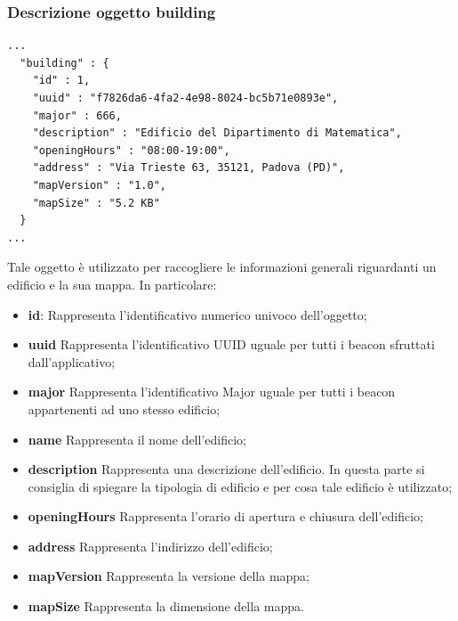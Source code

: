 \documentclass[../ManualeSviluppatore.tex]{subfiles}
\begin{document}
	\subsubsection{Descrizione oggetto building}
		\begin{lstlisting}
...
  "building" : {
    "id" : 1,
    "uuid" : "f7826da6-4fa2-4e98-8024-bc5b71e0893e",
    "major" : 666,
    "description" : "Edificio del Dipartimento di Matematica",
    "openingHours" : "08:00-19:00",
    "address" : "Via Trieste 63, 35121, Padova (PD)",
    "mapVersion" : "1.0",
    "mapSize" : "5.2 KB"
  }
...
		\end{lstlisting}
		Tale oggetto è utilizzato per raccogliere le informazioni generali riguardanti un edificio e la sua mappa. In particolare:
		\begin{itemize}
			\item \textbf{id}: Rappresenta l'identificativo numerico univoco dell'oggetto;
			\item \textbf{uuid} Rappresenta l'identificativo UUID uguale per tutti i \gls{beacon} sfruttati dall'applicativo;
			\item \textbf{major} Rappresenta l'identificativo Major uguale per tutti i \gls{beacon} appartenenti ad uno stesso edificio;
			\item \textbf{name} Rappresenta il nome dell'edificio;
			\item \textbf{description} Rappresenta una descrizione dell'edificio. In questa parte si consiglia di spiegare la tipologia di edificio e per cosa tale edificio è utilizzato;
			\item \textbf{openingHours} Rappresenta l'orario di apertura e chiusura dell'edificio;
			\item \textbf{address} Rappresenta l'indirizzo dell'edificio;
			\item \textbf{mapVersion} Rappresenta la versione della mappa;
			\item \textbf{mapSize} Rappresenta la dimensione della mappa.
		\end{itemize}
		
\end{document}
